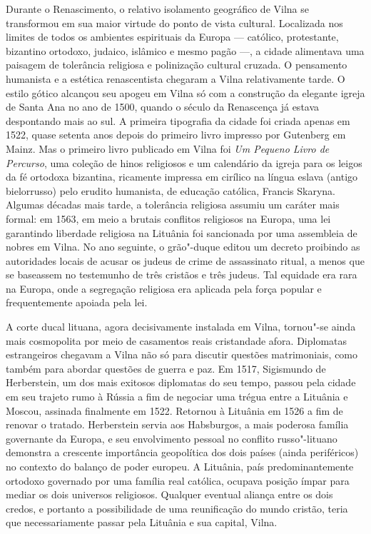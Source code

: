 Durante o Renascimento, o relativo isolamento geográfico de Vilna se
transformou em sua maior virtude do ponto de vista cultural. Localizada
nos limites de todos os ambientes espirituais da Europa --- católico,
protestante, bizantino ortodoxo, judaico, islâmico e mesmo pagão ---, a
cidade alimentava uma paisagem de tolerância religiosa e polinização
cultural cruzada. O pensamento humanista e a estética renascentista
chegaram a Vilna relativamente tarde. O estilo gótico alcançou seu
apogeu em Vilna só com a construção da elegante igreja de Santa Ana no
ano de 1500, quando o século da Renascença já estava despontando mais ao
sul. A primeira tipografia da cidade foi criada apenas em 1522, quase
setenta anos depois do primeiro livro impresso por Gutenberg em Mainz.
Mas o primeiro livro publicado em Vilna foi \textit{Um Pequeno Livro de
Percurso}, uma coleção de hinos religiosos e um calendário da igreja
para os leigos da fé ortodoxa bizantina, ricamente impressa em cirílico
na língua eslava (antigo bielorrusso) pelo erudito humanista, de educação
católica, Francis Skaryna. Algumas décadas mais tarde, a tolerância
religiosa assumiu um caráter mais formal: em 1563, em meio a brutais
conflitos religiosos na Europa, uma lei garantindo liberdade religiosa
na Lituânia foi sancionada por uma assembleia de nobres em Vilna. No ano
seguinte, o grão"-duque editou um decreto proibindo as autoridades locais
de acusar os judeus de crime de assassinato ritual, a menos que se
baseassem no testemunho de três cristãos e três judeus. Tal equidade era
rara na Europa, onde a segregação religiosa era aplicada pela força
popular e frequentemente apoiada pela lei.

A corte ducal lituana, agora decisivamente instalada em Vilna, tornou"-se
ainda mais cosmopolita por meio de casamentos reais cristandade afora.
Diplomatas estrangeiros chegavam a Vilna não só para discutir questões
matrimoniais, como também para abordar questões de guerra e paz. Em
1517, Sigismundo de Herberstein, um dos mais exitosos diplomatas do seu
tempo, passou pela cidade em seu trajeto rumo à Rússia a fim de negociar
uma trégua entre a Lituânia e Moscou, assinada finalmente em 1522.
Retornou à Lituânia em 1526 a fim de renovar o tratado. Herberstein
servia aos Habsburgos, a mais poderosa família governante da Europa, e
seu envolvimento pessoal no conflito russo"-lituano demonstra a crescente
importância geopolítica dos dois países (ainda periféricos) no contexto
do balanço de poder europeu. A Lituânia, país predominantemente ortodoxo
governado por uma família real católica, ocupava posição ímpar para
mediar os dois universos religiosos. Qualquer eventual aliança entre os
dois credos, e portanto a possibilidade de uma reunificação do mundo
cristão, teria que necessariamente passar pela Lituânia e sua capital,
Vilna.

